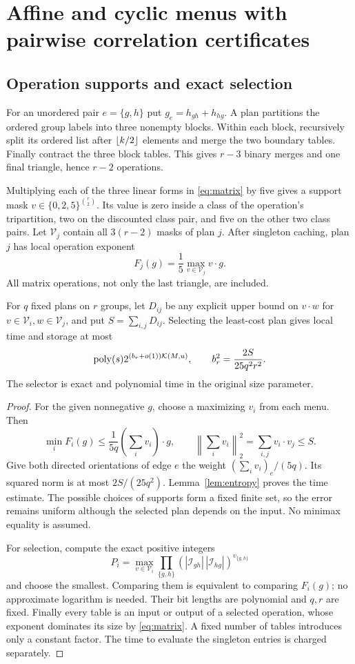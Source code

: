 \section{Affine and cyclic menus with pairwise correlation certificates}
\label{sec:menus}

\subsection{Operation supports and exact selection}
For an unordered pair $e=\{g,h\}$ put $g_e=h_{gh}+h_{hg}$.
A plan partitions the ordered group labels into three nonempty blocks.
Within each block, recursively split its ordered list after
$\left\lfloor k/2\right\rfloor$ elements and merge the two boundary tables. Finally contract
the three block tables. This gives $r-3$ binary merges and one final
triangle, hence $r-2$ operations.

Multiplying each of the three linear forms in \eqref{eq:matrix} by five
gives a support mask $v\in\{0,2,5\}^{\binom r2}$. Its value is zero
inside a class of the operation's tripartition, two on the discounted
class pair, and five on the other two class pairs. Let $\mathcal V_j$
contain all $3(r-2)$ masks of plan $j$. After singleton caching, plan $j$
has local operation exponent
\[
 F_j(g)=\frac15\max_{v\in\mathcal V_j}v\cdot g.
\]
All matrix operations, not only the last triangle, are included.

\begin{theorem}\label{thm:gram}
For $q$ fixed plans on $r$ groups, let $D_{ij}$ be any explicit upper bound
on $v\cdot w$ for $v\in\mathcal V_i,w\in\mathcal V_j$, and put
$S=\sum_{i,j}D_{ij}$. Selecting the least-cost plan gives local time and
storage at most
\[
 \operatorname{poly}(s)2^{(b_r+o(1))\mathcal K(M,u)},\qquad
 b_r^2=\frac{2S}{25q^2r^2}.
\]
The selector is exact and polynomial time in the original size parameter.
\end{theorem}
\begin{proof}
For the given nonnegative $g$, choose a maximizing $v_i$ from each menu.
Then
\[
 \min_i F_i(g)\le\frac1{5q}\left(\sum_i v_i\right)\cdot g,
 \qquad
 \left\|\sum_i v_i\right\|_2^2
       =\sum_{i,j}v_i\cdot v_j\le S.
\]
Give both directed orientations of edge $e$ the weight
$(\sum_i v_i)_e/(5q)$. Its squared norm is at most $2S/(25q^2)$.
Lemma~\ref{lem:entropy} proves the time estimate. The possible choices of
supports form a fixed finite set, so the error remains uniform although
the selected plan depends on the input. No minimax equality is assumed.

For selection, compute the exact positive integers
\[
 P_i=\max_{v\in\mathcal V_i}
       \prod_{\{g,h\}}
       (|\mathcal I_{gh}|\,|\mathcal I_{hg}|)^{v_{\{g,h\}}}
\]
and choose the smallest. Comparing them is equivalent to comparing
$F_i(g)$; no approximate logarithm is needed. Their bit lengths are
polynomial and $q,r$ are fixed. Finally every table is an input or output
of a selected operation, whose exponent dominates its size by
\eqref{eq:matrix}. A fixed number of tables introduces only a constant
factor. The time to evaluate the singleton entries is charged separately.
\end{proof}

